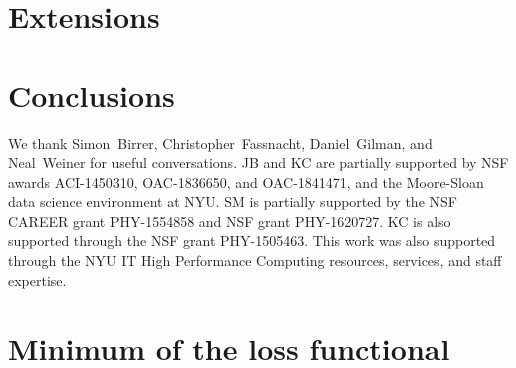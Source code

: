 \documentclass[twocolumn]{aastex62}
\begin{document}




\section{Extensions}
\label{sec:extensions}


\section{Conclusions}
\label{sec:conclusions}


\acknowledgements

We thank Simon~Birrer, Christopher~Fassnacht, Daniel~Gilman, and Neal~Weiner for useful conversations. JB and KC are partially supported by NSF awards ACI-1450310, OAC-1836650, and OAC-1841471, and the Moore-Sloan data science environment at NYU. SM is partially supported by the NSF CAREER grant PHY-1554858 and NSF grant PHY-1620727. KC is also supported through the NSF grant PHY-1505463. This work was also supported through the NYU IT High Performance Computing resources, services, and staff expertise.



\appendix
\section{Minimum of the loss functional}
\label{app:variation}
\end{document}
